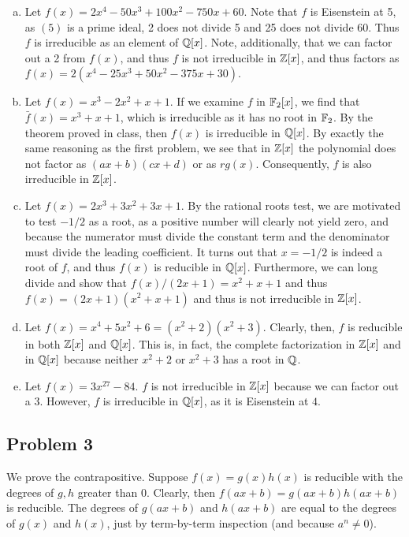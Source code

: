 \documentclass{../../mathnotes}
\begin{document}
\begin{enumerate}[(a)]
    \item Let $f(x)=2x^4-50x^3+100x^2-750x+60$. Note that $f$ is Eisenstein at 5, as $(5)$ is a prime ideal,
        2 does not divide 5 and 25 does not divide 60. Thus $f$ is irreducible as an element of $\mathbb{Q}[x]$. Note,
        additionally, that we can factor out a 2 from $f(x)$, and thus $f$ is not irreducible in $\mathbb{Z}[x]$, and thus
        factors as $f(x)=2(x^4-25x^3+50x^2-375x+30)$.
    \item Let $f(x)=x^3-2x^2+x+1$. If we examine $f$ in $\mathbb{F}_2[x]$, we find that $\bar f(x)=x^3+x+1$, which is
        irreducible as it has no root in $\mathbb{F}_2$. By the theorem proved in class, then $f(x)$ is irreducible
        in $\mathbb{Q}[x]$. By exactly the same reasoning as the first problem, we see that in $\mathbb{Z}[x]$ the polynomial does
        not factor as $(ax+b)(cx+d)$ or as $rg(x)$. Consequently, $f$ is also irreducible in $\mathbb{Z}[x]$. 
    \item Let $f(x)=2x^3+3x^2+3x+1$. By the rational roots test, we are motivated to test $-1/2$ as a root, as a positive number will clearly not yield zero,
        and because the numerator must divide the constant term and the denominator must divide the leading coefficient.
        It turns out that $x=-1/2$ is indeed a root of $f$, and thus $f(x)$ is reducible in $\mathbb{Q}[x]$. Furthermore, we can long divide
        and show that $f(x)/(2x+1)=x^2+x+1$ and thus $f(x)=(2x+1)(x^2+x+1)$ and thus is not irreducible in $\mathbb{Z}[x]$.
    \item Let $f(x)=x^4+5x^2+6=(x^2+2)(x^2+3)$. Clearly, then, $f$ is reducible in both $\mathbb{Z}[x]$ and $\mathbb{Q}[x]$. This is, in fact,
        the complete factorization in $\mathbb{Z}[x]$ and in $\mathbb{Q}[x]$ because neither $x^2+2$ or $x^2+3$ has a root in $\mathbb{Q}$.
    \item  Let $f(x)=3x^{27}-84$. $f$ is not irreducible in $\mathbb{Z}[x]$ because we can factor out a 3. However, $f$ is irreducible
        in $\mathbb{Q}[x]$, as it is Eisenstein at $4$.
\end{enumerate}

\subsection*{Problem 3}

We prove the contrapositive. Suppose $f(x)=g(x)h(x)$ is reducible with the degrees of $g,h$ greater than 0.
Clearly, then $f(ax+b)=g(ax+b)h(ax+b)$ is reducible. The degrees of $g(ax+b)$ and $h(ax+b)$ are equal to the
degrees of $g(x)$ and $h(x)$, just by term-by-term inspection (and because $a^n\neq 0$).
\end{document}
